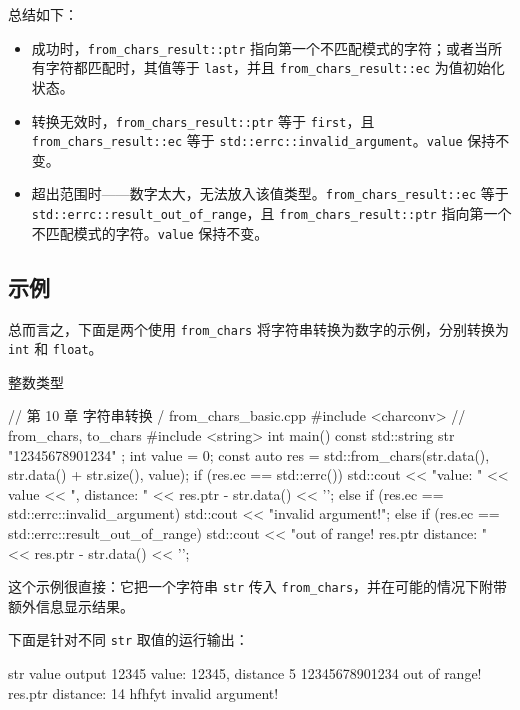 总结如下：
\begin{itemize}
\item 成功时，\texttt{from\_chars\_result::ptr} 指向第一个不匹配模式的字符；或者当所有字符都匹配时，其值等于 \texttt{last}，并且 \texttt{from\_chars\_result::ec} 为值初始化状态。
\item 转换无效时，\texttt{from\_chars\_result::ptr} 等于 \texttt{first}，且 \texttt{from\_chars\_result::ec} 等于 \texttt{std::errc::invalid\_argument}。\texttt{value} 保持不变。
\item 超出范围时——数字太大，无法放入该值类型。\texttt{from\_chars\_result::ec} 等于 \texttt{std::errc::result\_out\_of\_range}，且 \texttt{from\_chars\_result::ptr} 指向第一个不匹配模式的字符。\texttt{value} 保持不变。
\end{itemize}

\subsection{示例}

总而言之，下面是两个使用 \texttt{from\_chars} 将字符串转换为数字的示例，分别转换为 \texttt{int} 和 \texttt{float}。

整数类型

\begin{codebox}[cpp]
// 第 10 章 字符串转换 / from_chars_basic.cpp
#include <charconv> // from_chars, to_chars
#include <string>
int main()
{
    const std::string str { "12345678901234" };
    int value = 0;
    const auto res = std::from_chars(str.data(),
                                     str.data() + str.size(),
                                     value);
    if (res.ec == std::errc())
    {
        std::cout << "value: " << value
                  << ", distance: " << res.ptr - str.data() << '\n';
    }
    else if (res.ec == std::errc::invalid_argument)
    {
        std::cout << "invalid argument!\n";
    }
    else if (res.ec == std::errc::result_out_of_range)
    {
        std::cout << "out of range! res.ptr distance: "
                  << res.ptr - str.data() << '\n';
    }
}
\end{codebox}

这个示例很直接：它把一个字符串 \texttt{str} 传入 \texttt{from\_chars}，并在可能的情况下附带额外信息显示结果。

下面是针对不同 \texttt{str} 取值的运行输出：

\begin{codebox}[cpp]
str value
output
12345
value: 12345, distance 5
12345678901234
out of range! res.ptr distance: 14
hfhfyt
invalid argument!
\end{codebox}

